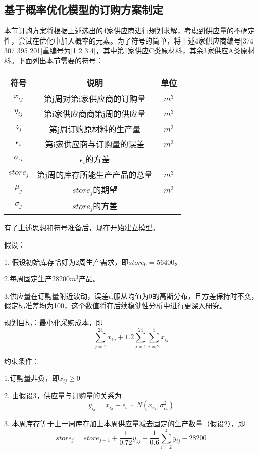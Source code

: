 \documentclass{my_paper}
\begin{document}
\subsection{基于概率优化模型的订购方案制定}
本节订购方案将根据上述选出的4家供应商进行规划求解，考虑到供应量的不确定性，尝试在优化中加入概率的元素。为了符号的简单，将上述4家供应商编号[374 307 395 201]重编号为[1 2 3 4]，其中第1家供应C类原材料，其余3家供应A类原材料。下面列出本节需要的符号：
\begin{table}[h]
		\centering
		\begin{tabular}{ccc}
			\hline
			符号 &  说明  & 单位 \\
			\hline
      $x_{ij}$ & 第j周对第i家供应商的订购量  & $m^3$ \\
      $y_{ij}$ & 第i家供应商商第j周的供应量 & $m^3$ \\
      $z_{j}$ & 第j周订购原材料的生产量 & $m^3$ \\
      $\epsilon_i$ & 第i家供应商与订购量的误差 & $m^3$ \\
      $\sigma_{\epsilon i}$ & $\epsilon_i$的方差 &  \\
      $store_{j}$ & 第j周的库存所能生产产品的总量 & $m^3$ \\
      $\mu_j$ & $store_{j}$的期望 & $m^3$ \\
      $\sigma_j$ & $store_{j}$的方差 & \\
		\end{tabular}
	\end{table}
  
 有了上述思想和符号准备后，现在开始建立模型。
 
 假设：
 
 1. 假设初始库存恰好为2周生产需求，即$store_0=56400$。
 
 2.每周固定生产28200$m^3$产品。
 
 3.供应量在订购量附近波动，误差$\epsilon_i$服从均值为0的高斯分布，且方差保持时不变，假定标准差均为100，这个数值将在后续稳健性分析中进行更深入研究。
  
  规划目标：最小化采购成本，即
  $$\sum_{j=1}^{24}x_{1j} + 1.2 \sum_{j=1}^{24}\sum_{i=2}^{4}x_{ij}$$
  
  约束条件：
  
  1.订购量非负，即$x_{ij}\ge 0$
  
  2. 由假设3，供应量与订购量的关系为
  $$y_{ij}=x_{ij}+\epsilon_i \sim N(x_{ij},\sigma_{\epsilon i}^2)$$
  
  3. 本周库存等于上一周库存加上本周供应量减去固定的生产数量（假设2），即
  $$store_j=store_{j-1} + \frac{1}{0.72}y_{1j} + \frac{1}{0.6}\sum_{i=2}^{4}y_{ij} -28200$$
  
\end{document}
